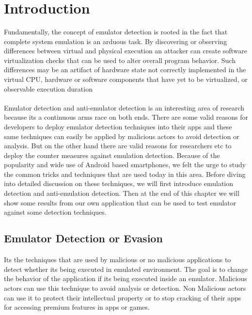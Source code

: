 \documentclass[../main.tex]{subfile}
\begin{document}
	\section{Introduction}\label{sec::intorduction}
	\paragraph{} Fundamentally, the concept of emulator detection is rooted in the fact that complete system emulation is an arduous task. By discovering or observing differences between virtual and physical execution an attacker can create software virtualization checks that can be used to alter overall program behavior. Such differences may be an artifact of hardware state not correctly implemented in the virtual CPU, hardware or software components that have yet to be virtualized, or observable execution duration \cite{vidas2014evading}
	\paragraph{} Emulator detection and anti-emulator detection is an interesting area of research because its a continuous arms race on both ends. There are some valid reasons for developers to deploy emulator detection techniques into their apps and these same techniques can easily be applied by malicious actors to avoid detection or analysis. But on the other hand there are valid reasons for researchers etc to deploy the counter measures against emulation detection. Because of the popularity and wide use of Android based smartphones, we felt the urge to study the common tricks and techniques that are used today in this area. Before diving into detailed discussion on these techniques, we will first introduce emulation detection and anti-emulation detection. Then at the end of this chapter we will show some results from our own application that can be used to test emulator against some detection techniques.

	\subsection{Emulator Detection or Evasion}\label{sec::emu_detection}
	\paragraph{} Its the techniques that are used by malicious or no malicious applications to detect whether its being executed in emulated environment. The goal  is to change the behavior of the application if its being executed inside an emulator. Malicious actors can use this technique to avoid analysis or detection. Non Malicious actors can use it to protect their intellectual property or to stop cracking of their apps for accessing premium features in apps or games.
	
\end{document}
